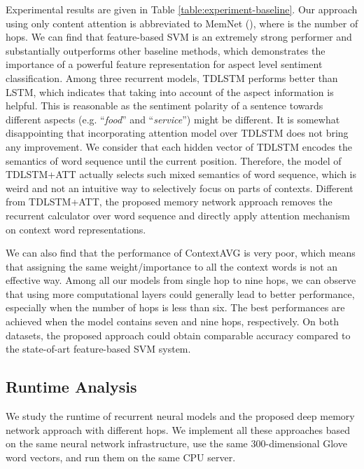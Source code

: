 \documentclass[11pt,letterpaper]{article}
\begin{document}
Experimental results are given in Table \ref{table:experiment-baseline}. 
Our approach using only content attention is abbreviated to MemNet (), where  is the number of hops. 
We can find that feature-based SVM is an extremely strong performer and substantially outperforms other baseline methods, which demonstrates the importance of a powerful feature representation for aspect level sentiment classification. 
Among three recurrent models, TDLSTM performs better than LSTM, which indicates that taking into account of the aspect information is helpful. 
This is reasonable as the sentiment polarity of a sentence towards different aspects (e.g. ``\textit{food}'' and ``\textit{service}'') might be different. 
It is somewhat disappointing that incorporating attention model over TDLSTM does not bring any improvement. 
We consider that each hidden vector of TDLSTM encodes the semantics of word sequence until the current position. Therefore, the model of TDLSTM+ATT actually selects such mixed semantics of word sequence, which is weird and not an intuitive way to selectively focus on parts of contexts. 
Different from TDLSTM+ATT, the proposed memory network approach removes the recurrent calculator over word sequence and directly apply attention mechanism on context word representations.

We can also find that the performance of ContextAVG is very poor, which means that assigning the same weight/importance to all the context words is not an effective way. 
Among all our models from single hop to nine hops, we can observe that using more computational layers could generally lead to better performance, especially when the number of hops is less than six.
The best performances are achieved when the model contains seven and nine hops, respectively. 
On both datasets, the proposed approach could obtain comparable accuracy compared to the state-of-art feature-based SVM system. 


\subsection{Runtime Analysis}
We study the runtime of recurrent neural models and the proposed deep memory network approach with different hops. 
We implement all these approaches based on the same neural network infrastructure, use the same 300-dimensional Glove word vectors, and run them on the same CPU server. 
\end{document}

